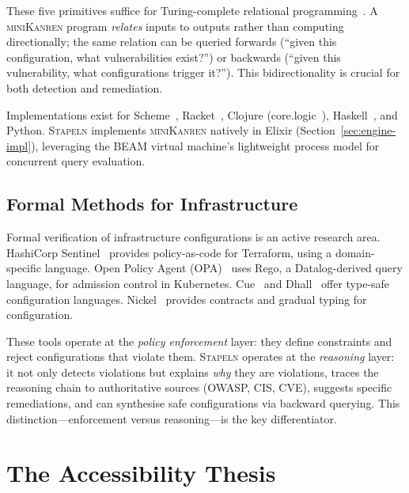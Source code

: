 \documentclass[11pt,twocolumn]{article}
\newcommand{\stapeln}{\textsc{Stapeln}\xspace}
\newcommand{\minikanren}{\textsc{miniKanren}\xspace}
\begin{document}
These five primitives suffice for Turing-complete relational
programming~\cite{byrd2017}. A \minikanren program \emph{relates}
inputs to outputs rather than computing directionally; the same
relation can be queried forwards (``given this configuration, what
vulnerabilities exist?'') or backwards (``given this vulnerability,
what configurations trigger it?''). This bidirectionality is crucial
for both detection and remediation.

Implementations exist for Scheme~\cite{friedman2005},
Racket~\cite{racketkanren}, Clojure (core.logic~\cite{corelogic}),
Haskell~\cite{kiselyov2005}, and Python. \stapeln implements
\minikanren natively in Elixir (Section~\ref{sec:engine-impl}),
leveraging the BEAM virtual machine's lightweight process model for
concurrent query evaluation.

\subsection{Formal Methods for Infrastructure}
\label{sec:bg-formal}

Formal verification of infrastructure configurations is an active
research area. HashiCorp Sentinel~\cite{sentinel2024} provides
policy-as-code for Terraform, using a domain-specific language.
Open Policy Agent (OPA)~\cite{opa2024} uses Rego, a Datalog-derived
query language, for admission control in Kubernetes. Cue~\cite{cue2024}
and Dhall~\cite{dhall2024} offer type-safe configuration languages.
Nickel~\cite{nickel2024} provides contracts and gradual typing for
configuration.

These tools operate at the \emph{policy enforcement} layer: they
define constraints and reject configurations that violate them. \stapeln
operates at the \emph{reasoning} layer: it not only detects violations
but explains \emph{why} they are violations, traces the reasoning
chain to authoritative sources (OWASP, CIS, CVE), suggests specific
remediations, and can synthesise safe configurations via backward
querying. This distinction---enforcement versus reasoning---is the
key differentiator.


\section{The Accessibility Thesis}
\label{sec:accessibility}
\end{document}

